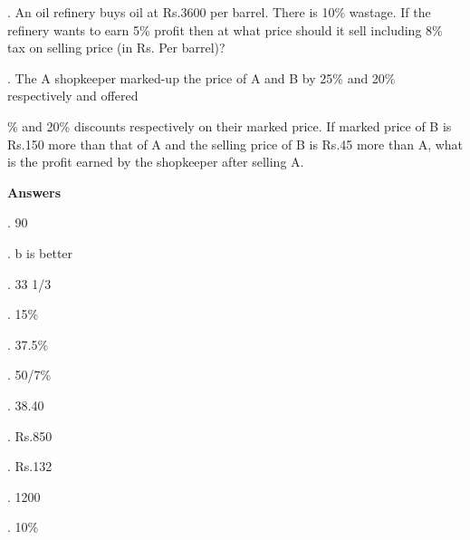\documentclass{article}
\begin{document}
	\noindent 
	
	\noindent 
	
	. An oil refinery buys oil at Rs.3600 per barrel. There is 10\% wastage. If the refinery wants to earn 5\% profit then at what price should it sell including 8\% tax on selling price (in Rs. Per barrel)?
	
	\noindent 
	
	\noindent 
	
	. The A shopkeeper marked-up the price of A and B by 25\% and 20\% respectively and offered
	
	\noindent 
	
	\% and 20\% discounts respectively on their marked price. If marked price of B is Rs.150 more than that of A and the selling price of B is Rs.45 more than A, what is the profit earned by the shopkeeper after selling A.
	
	\noindent 
	
	\noindent 
	
	\noindent 
	
	\noindent 
	
	\noindent \textbf{Answers}
	
	\noindent 
	
	\noindent 
	
	.   90
	
	\noindent 
	
	.   b is better
	
	\noindent 
	
	.   33 1/3
	
	\noindent 
	
	.   15\%
	
	\noindent 
	
	.   37.5\%
	
	\noindent 
	
	.   50/7\%
	
	\noindent 
	
	.   38.40
	
	\noindent 
	
	.   Rs.850
	
	\noindent 
	
	.   Rs.132
	
	\noindent 
	
	. 1200
	
	\noindent 
	
	. 10\%
	
	\noindent 
	
\end{document}
